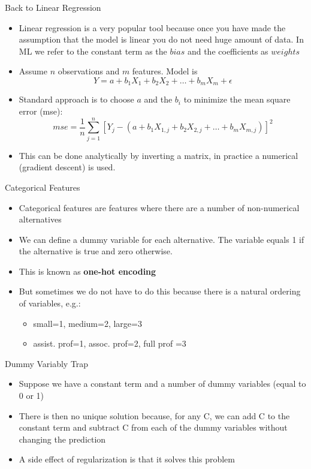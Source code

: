 \documentclass[11pt]{beamer}
\begin{document}
\begin{frame}{Back to Linear Regression}
	\begin{itemize}
		\item Linear regression is a very popular tool because once you have made the assumption that the model is linear you do not need huge amount of data. In ML we refer to the constant term as the $bias$ and the coefficients as $weights$
		\item Assume $n$ observations and $m$ features. Model is
		$$ Y = a+b_1X_1+b_2X_2+\dots+b_mX_m+\epsilon$$
		\item Standard approach is to choose $a$ and the $b_i$ to minimize the mean square error (mse):
		\begin{equation}
			mse = \frac{1}{n}\sum\limits_{j=1}^n \left[ 
			Y_j - \left(a + b_1X_{1,j} + b_2 X_{2,j} + \dots + b_mX_{m,j} \right)
			\right]^2
		\end{equation}		 
		\item This can be done analytically by inverting a matrix, in practice a numerical (gradient descent) is used.
	\end{itemize}
\end{frame}
\begin{frame}{Categorical Features}
	\begin{itemize}
		\item Categorical features are features where there are a number of non-numerical alternatives 
		\item We can define a dummy variable for each alternative. The variable equals 1 if the alternative is true and zero otherwise. 
		\item This is known as \textbf{one-hot encoding}
		\item But sometimes we do not have to do this because there is a natural ordering of variables, e.g.:
		\begin{itemize}
		\item 	small=1, medium=2, large=3
		\item    assist. prof=1, assoc. prof=2, full prof =3
		\end{itemize}
	\end{itemize}
\end{frame}
\begin{frame}{Dummy Variably Trap}
	\begin{itemize}
		\item Suppose we have a constant term and a number of dummy variables (equal to 0 or 1)
		\item There is then no unique solution because, for any C,  we can add C to the constant term and subtract C from each of the dummy variables without changing the prediction
		\item A side effect of regularization is that it solves this problem
	\end{itemize}
\end{frame}
\end{document}

